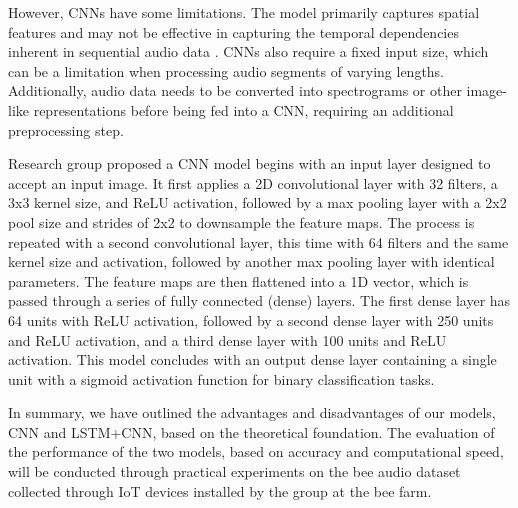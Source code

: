 However, CNNs have some limitations. The model primarily captures spatial features and may
not be effective in capturing the temporal dependencies inherent in sequential
audio data \cite{lim2020time}. CNNs also require a fixed input size, which can be a limitation when
processing audio segments of varying lengths. Additionally, audio data needs to be
converted into spectrograms or other image-like representations before being fed into a CNN,
requiring an additional preprocessing step.

Research group proposed a CNN model begins with an input layer
designed to accept an input image. It first applies a 2D convolutional
layer with 32 filters, a 3x3 kernel size, and ReLU activation,
followed by a max pooling layer with a 2x2 pool size and strides of
2x2 to downsample the feature maps. The process is repeated with a
second convolutional layer, this time with 64 filters and the same
kernel size and activation, followed by another max pooling layer with
identical parameters. The feature maps are then flattened into a
1D vector, which is passed through a series of fully connected
(dense) layers. The first dense layer has 64 units with ReLU
activation, followed by a second dense layer with 250 units and
ReLU activation, and a third dense layer with 100 units and ReLU
activation. This model concludes with an output dense layer containing
a single unit with a sigmoid activation function for binary
classification tasks.

In summary, we have outlined the advantages and disadvantages of our
models, CNN and LSTM+CNN, based on the theoretical foundation. The
evaluation of the performance of the two models, based on accuracy and
computational speed, will be conducted through practical experiments
on the bee audio dataset collected through IoT devices installed by
the group at the bee farm.
